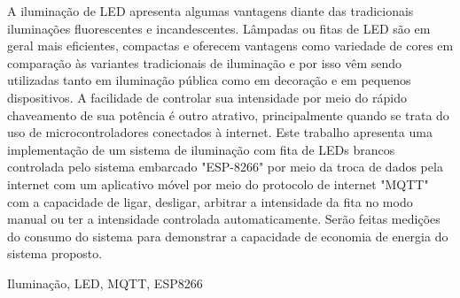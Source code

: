 A iluminação de LED apresenta algumas vantagens diante das tradicionais iluminações fluorescentes e incandescentes. Lâmpadas ou fitas de LED são em geral mais eficientes, compactas e oferecem vantagens como variedade de cores em comparação às variantes tradicionais de iluminação e por isso vêm sendo utilizadas tanto em iluminação pública como em decoração e em pequenos dispositivos. A facilidade de controlar sua intensidade por meio do rápido chaveamento de sua potência é outro atrativo, principalmente quando se trata do uso de microcontroladores conectados à internet. Este trabalho apresenta uma implementação de um sistema de iluminação com fita de LEDs brancos controlada pelo sistema embarcado "ESP-8266" por meio da troca de dados pela internet com um aplicativo móvel por meio do protocolo de internet "MQTT" com a capacidade de ligar, desligar, arbitrar a intensidade da fita no modo manual ou ter a intensidade controlada automaticamente. Serão feitas medições do consumo do sistema para demonstrar a capacidade de economia de energia do sistema proposto.

\begin{keywords}
    Iluminação, LED, MQTT, ESP8266
\end{keywords}
